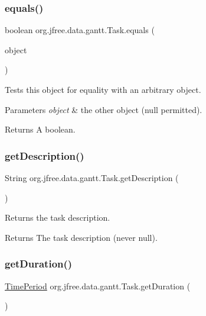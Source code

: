 \subsubsection{\texorpdfstring{equals()}{equals()}}
{\footnotesize\ttfamily boolean org.\+jfree.\+data.\+gantt.\+Task.\+equals (\begin{DoxyParamCaption}\item[{Object}]{object }\end{DoxyParamCaption})}

Tests this object for equality with an arbitrary object.


\begin{DoxyParams}{Parameters}
{\em object} & the other object ({\ttfamily null} permitted).\\
\hline
\end{DoxyParams}
\begin{DoxyReturn}{Returns}
A boolean. 
\end{DoxyReturn}
\mbox{\label{classorg_1_1jfree_1_1data_1_1gantt_1_1_task_a663fe2b623805aa2b753862e09a62f5e}} 
\subsubsection{\texorpdfstring{get\+Description()}{getDescription()}}
{\footnotesize\ttfamily String org.\+jfree.\+data.\+gantt.\+Task.\+get\+Description (\begin{DoxyParamCaption}{ }\end{DoxyParamCaption})}

Returns the task description.

\begin{DoxyReturn}{Returns}
The task description (never {\ttfamily null}). 
\end{DoxyReturn}
\mbox{\label{classorg_1_1jfree_1_1data_1_1gantt_1_1_task_a9562b2f5ca9bcce5f07cb33b2ef59392}} 
\subsubsection{\texorpdfstring{get\+Duration()}{getDuration()}}
{\footnotesize\ttfamily \mbox{\hyperlink{interfaceorg_1_1jfree_1_1data_1_1time_1_1_time_period}{Time\+Period}} org.\+jfree.\+data.\+gantt.\+Task.\+get\+Duration (\begin{DoxyParamCaption}{ }\end{DoxyParamCaption})}

